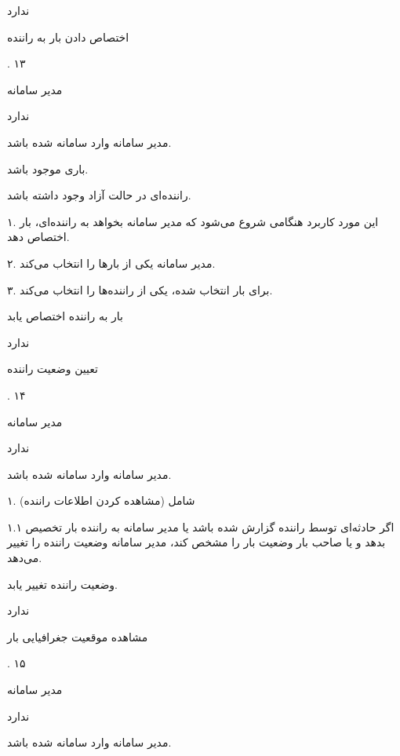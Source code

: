 ندارد

\noindent \hrulefill

اختصاص دادن بار به راننده

.
۱۳

مدیر سامانه

ندارد


مدیر سامانه وارد سامانه شده باشد.

باری موجود باشد.

راننده‌ای در حالت آزاد وجود داشته باشد.


۱. این مورد کاربرد هنگامی شروع می‌شود که مدیر سامانه بخواهد به راننده‌ای، بار اختصاص دهد.

۲. مدیر سامانه یکی از بارها را انتخاب می‌کند.

۳. برای بار انتخاب شده، یکی از راننده‌ها را انتخاب می‌کند.

بار به راننده اختصاص یابد

ندارد

\noindent \hrulefill

تعیین وضعیت راننده

.
۱۴

مدیر سامانه

ندارد

مدیر سامانه وارد سامانه شده باشد.


۱. شامل (مشاهده کردن اطلاعات راننده)

۱.۱ اگر حادثه‌ای توسط راننده گزارش شده باشد یا مدیر سامانه به راننده بار تخصیص بدهد و یا صاحب بار وضعیت بار را مشخص کند، مدیر سامانه وضعیت راننده را تغییر می‌دهد.

وضعیت راننده تغییر یابد.

ندارد


\noindent \hrulefill

مشاهده موقعیت جغرافیایی بار

.
۱۵

مدیر سامانه

ندارد

مدیر سامانه وارد سامانه شده باشد.


